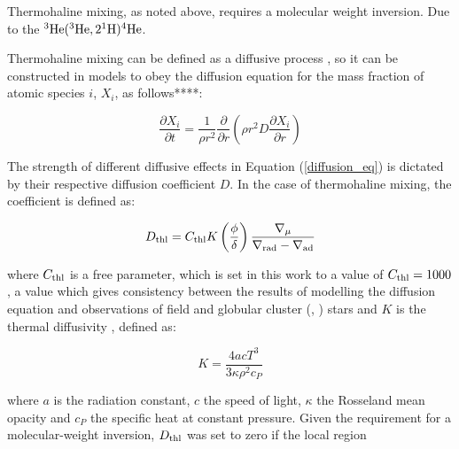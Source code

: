 \documentclass[usenatbib]{mnras}
\begin{document}
Thermohaline mixing, as noted above, requires a molecular weight inversion. Due to the $^{3}\textnormal{He}(^{3}\textnormal{He},2^{1}\textnormal{H})^{4}\textnormal{He}$.

Thermohaline mixing can be defined as a diffusive process \citep{1980A&A....91..175K}, so it can be constructed in models to obey the diffusion equation for the mass fraction of atomic species $i$, $X_{i}$, as follows****:

\begin{equation}
\frac{\partial X_{i}}{\partial t} = \frac{1}{\rho r^{2}}\frac{\partial}{\partial r} \left( \rho r^{2} D \frac{\partial X_{i}}{\partial r} \right)
\label{diffusion_eq}
\end{equation}

The strength of different diffusive effects in Equation (\ref{diffusion_eq}) is dictated by their respective diffusion coefficient $D$. In the case of thermohaline mixing, the coefficient is defined \cite{2010A&A...521A...9C} as:

\begin{equation}
D_{\textnormal{thl}} = C_{\textnormal{thl}} K \left( \frac{\phi}{\delta} \right) \frac{\nabla _{\mu}}{\nabla _{\textnormal{rad}} - \nabla _{\textnormal{ad}}}
\label{Dthl_def}
\end{equation}

where $C_{\textnormal{thl}}$ is a free parameter, which is set in this work to a value of $C_{\textnormal{thl}} = 1000$, a value which gives consistency between the results of modelling the diffusion equation and observations of field \citep{2007A&A...467L..15C} and globular cluster (\citet{2011ApJ...728...79A}, \citet{2012ApJ...749..128A}) stars and $K$ is the thermal diffusivity \citep{2017RSOS....470192S}, defined as:

\begin{equation}
K = \frac{4acT^{3}}{3\kappa\rho ^{2}c_{P}}
\label{diffusivity_def}
\end{equation}

where $a$ is the radiation constant, $c$ the speed of light, $\kappa$ the Rosseland mean opacity and $c_{P}$ the specific heat at constant pressure.
Given the requirement for a molecular-weight inversion, $D_{\textnormal{thl}}$ was set to zero if the local region 



%
\end{document}
